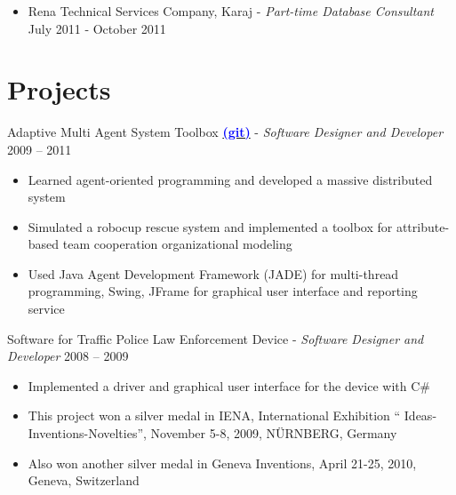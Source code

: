 \documentclass[letter]{res}
\begin{document}
\begin{resume}
\begin{itemize}
  \item Rena Technical Services Company, Karaj \newline
- {\sl Part-time Database Consultant} \hfill July 2011 - October 2011\\
	\vspace{-4mm}

\end{itemize}

\section{Projects}
Adaptive Multi Agent System Toolbox {\href{https://github.com/omid55/team_based_rescue_jade_multi_agent_system}{\textbf{\textcolor{blue}{(git)}}}} \newline
  - {\sl Software Designer and Developer} \hfill 2009 – 2011\\
  \vspace{-4mm}
  \iflong
    \begin{itemize}
    \item Learned agent-oriented programming and developed a massive distributed system
    \item Simulated a robocup rescue system and implemented a toolbox for 				attribute-based team cooperation organizational modeling
    \item Used Java Agent Development Framework (JADE) for multi-thread programming, 		Swing, JFrame for graphical user interface and reporting service
    \end{itemize}
  \fi

Software for Traffic Police Law Enforcement Device \newline
   - {\sl Software Designer and Developer} \hfill 2008 – 2009\\
   \vspace{-4mm}
   \iflong
      \begin{itemize}
        \item Implemented a driver and graphical user interface for the device with C\#
        \item This project won a silver medal in IENA, International Exhibition `` Ideas-Inventions-Novelties'', November 5-8, 2009, N\"{U}RNBERG, Germany
        \item Also won another silver medal in Geneva Inventions, April 21-25, 2010, Geneva, Switzerland
      \end{itemize}
   \fi
   

\end{resume}
\end{document}

